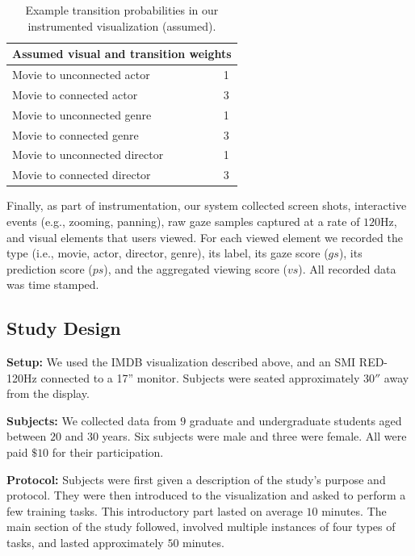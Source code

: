 \begin{table}[htbp]
	\centering
		\begin{tabular}{|l|c|}
			\hline
			 \multicolumn{2}{|c|}{Assumed visual and transition weights} \\ \hline
			Movie to unconnected actor & 1\\\hline
			Movie to connected actor & 3\\\hline
			Movie to unconnected genre & 1\\\hline
			Movie to connected genre & 3\\\hline
			Movie to unconnected director & 1\\\hline
			Movie to connected director & 3\\\hline
			\hline			
		\end{tabular}
	\caption{Example transition probabilities in our instrumented visualization (assumed).}
	\label{tab:Transition2}
\end{table}

Finally, as part of instrumentation, our system collected screen shots, interactive events (e.g., zooming, panning), raw gaze samples captured at a rate of $120$Hz, and visual elements that users viewed. For each viewed element we recorded the type (i.e., movie, actor, director, genre), its label, its gaze score ($gs$), its prediction score ($ps$), and the aggregated viewing score ($vs$). All recorded data was time stamped.

\subsection{Study Design}
\label{sec:EvalStudyDesign}

\noindent\textbf{Setup: } We used the IMDB visualization described above, and an SMI RED-120Hz connected to a 17'' monitor. Subjects were seated approximately $30''$ away from the display. 

\noindent\textbf{Subjects:} We collected data from $9$ graduate and undergraduate students aged between $20$ and $30$ years. Six subjects were male and three were female. All were paid $\$10$ for their participation. 

\noindent\textbf{Protocol:} Subjects were first given a description of the study's purpose and protocol. They were then introduced to the visualization and asked to perform a few training tasks. This introductory part lasted on average $10$ minutes. The main section of the study followed, involved multiple instances of four types of tasks, and lasted approximately $50$ minutes. 

